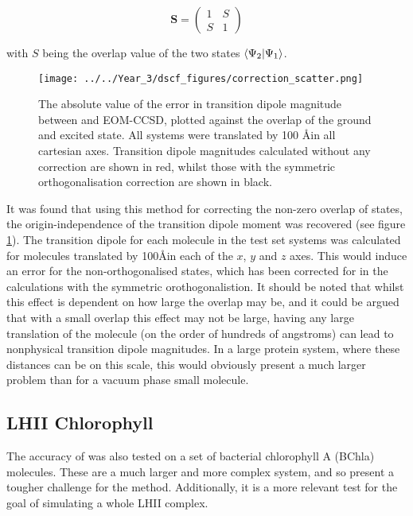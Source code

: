 \begin{equation}
\mathbf{S} = \begin{pmatrix}
    1 & S \\
    S & 1 
\end{pmatrix}
\end{equation}

with $S$ being the overlap value of the two states $\braket{\Psi_2|\Psi_1}$.

\begin{figure}
\centering
\texttt{[image: ../../Year\_3/dscf\_figures/correction\_scatter.png]}
\label{fig:correction_scatter}
\caption{The absolute value of the error in transition dipole magnitude between
\dscf and EOM-CCSD, plotted against the \dscf overlap of the ground and excited
state. All systems were translated by 100 \AA  in all cartesian axes. Transition
dipole magnitudes calculated without any correction are shown in red, whilst
those with the symmetric orthogonalisation correction are shown in black.}
\end{figure}

It was found that using this method for correcting the non-zero overlap of states, 
the origin-independence of the transition dipole moment was recovered (see figure
\ref{fig:correction_scatter}).
The transition dipole for each molecule in the test set systems was calculated
for molecules translated by 100\AA  in each of the $x$, $y$ and $z$ axes.
This would induce an error for the non-orthogonalised states, which has been
corrected for in the calculations with the symmetric orothogonalistion.
It should be noted that whilst this effect is dependent on how large the overlap may be, and
it could be argued that with a small overlap this effect may not be large, having 
any large translation of the molecule (on the order of hundreds of angstroms) can
lead to nonphysical transition dipole magnitudes. In a large protein system, where
these distances can be on this scale, this would obviously present a much larger problem
than for a vacuum phase small molecule.

\subsection{LHII Chlorophyll}
\label{subsec:dscf_chl_tests}
The accuracy of \dscf was also tested on a set of bacterial chlorophyll A (BChla) 
molecules. These are a much larger and more complex system, and so present a tougher
challenge for the \dscf method. Additionally, it is a more relevant test for the
goal of simulating a whole LHII complex.

